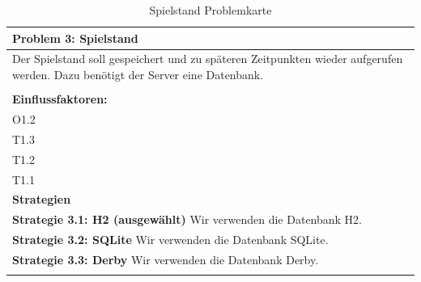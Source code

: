 \documentclass[fontsize=12pt,paper=a4,twoside]{scrartcl}
\begin{document}
\begin{table}[H]
    \centering
    \begin{tabular}{|p{15cm}|}
    \hline
          \textbf{Problem 3: Spielstand}  \\ \hline
	Der Spielstand soll gespeichert und zu späteren Zeitpunkten wieder aufgerufen werden. Dazu benötigt der Server eine Datenbank. \\
         \\ \hline
          \textbf{Einflussfaktoren: } \\
	O1.2 \\
	T1.3 \\
	T1.2 \\
	T1.1 \\
          \hline
          \textbf{Strategien} \\ \hline
            {}          
           \label{strategie:3.1}     
          \textbf{Strategie 3.1: H2 (ausgewählt)}  Wir verwenden die Datenbank H2. \\        
  {}          
           \label{strategie:3.2}              
          \textbf{Strategie 3.2: SQLite} Wir verwenden die Datenbank SQLite. \\
	 {}          
           \label{strategie:3.3}     
          \textbf{Strategie 3.3: Derby } Wir verwenden die Datenbank Derby. \\ 
	 \\ \hline
    \end{tabular}

    \caption{Spielstand Problemkarte}
    \label{tab:ProblemKarte3}
\end{table}
\end{document}
